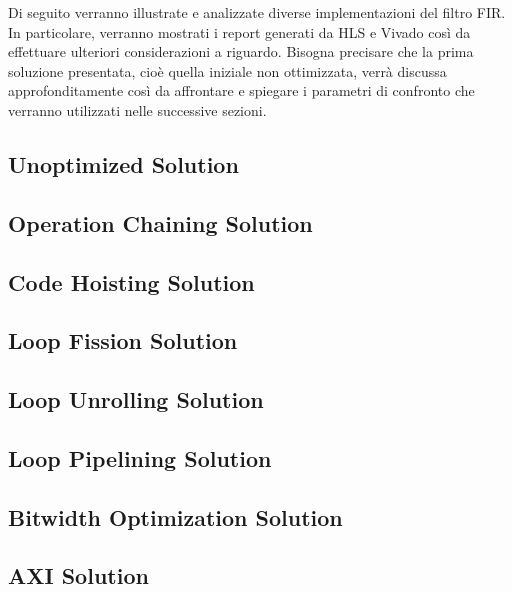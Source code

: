 Di seguito verranno illustrate e analizzate diverse implementazioni del filtro FIR. In particolare, verranno mostrati i report generati da HLS e Vivado così da effettuare ulteriori considerazioni a riguardo. Bisogna precisare che la prima soluzione presentata, cioè quella iniziale non ottimizzata, verrà discussa approfonditamente così da affrontare e spiegare i parametri di confronto che verranno utilizzati nelle successive sezioni.

\subsection{Unoptimized Solution}

\newpage

\subsection{Operation Chaining Solution}

\newpage

\subsection{Code Hoisting Solution}

\newpage

\subsection{Loop Fission Solution}

\newpage

\subsection{Loop Unrolling Solution}

\newpage

\subsection{Loop Pipelining Solution}

\newpage

\subsection{Bitwidth Optimization Solution}

\newpage

\subsection{AXI Solution}
